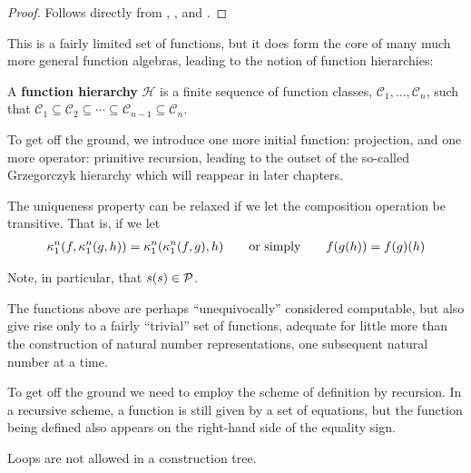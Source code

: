 \begin{proof} Follows directly from , ,
and . \end{proof}

This is a fairly limited set of functions, but it does form the core of many
much more general function algebras, leading to the notion of function
hierarchies:

\begin{definition} A \textbf{function hierarchy} $\mathcal{H}$ is a finite
sequence of function classes, $\mathcal{C}_1, \ldots, \mathcal{C}_n$, such that
$\mathcal{C}_1 \subseteq \mathcal{C}_2 \subseteq \cdots \subseteq
\mathcal{C}_{n-1} \subseteq \mathcal{C}_n$. \end{definition}

To get off the ground, we introduce one more initial function: projection, and
one more operator: primitive recursion, leading to the outset of the so-called
Grzegorczyk hierarchy which will reappear in later chapters.

The uniqueness property can be relaxed if we let the composition operation be
transitive. That is, if we let\begin{align*}
%
\kappa^n_1\p{f,\kappa^n_1\p{g,h}} = \kappa^n_1\p{\kappa^n_1\p{f,g},h}
%
\quad \quad \text{or simply} \quad \quad
%
f\p{g\p{h}} = f\p{g}\p{h}
%
\end{align*}


Note, in particular, that $s{\mathopen{}\left({s}\right)\mathclose{}} \in \mathcal{P}$.

The functions above are perhaps ``unequivocally'' considered computable, but
also give rise only to a fairly ``trivial'' set of functions, adequate for
little more than the construction of natural number representations, one
subsequent natural number at a time.


To get off the ground we need to employ the scheme of definition by recursion.
In a recursive scheme, a function is still given by a set of equations, but the
function being defined also appears on the right-hand side of the equality
sign.

Loops are not allowed in a construction tree.


